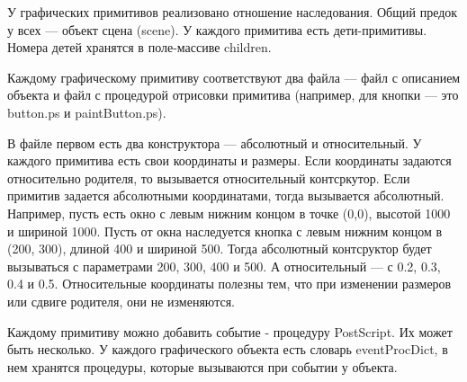 \documentclass[14pt]{extarticle}
\begin{document}
		У графических примитивов реализовано отношение наследования. Общий предок у всех --- объект сцена (scene). У каждого примитива есть дети-примитивы. Номера детей хранятся в поле-массиве children.
		
		Каждому графическому примитиву соответствуют два файла --- файл с описанием объекта и файл с процедурой отрисовки примитива (например, для кнопки --- это button.ps и paintButton.ps). 
		
		В файле первом есть два конструктора --- абсолютный и относительный. У каждого примитива есть свои координаты и размеры. Если координаты задаются относительно родителя, то вызывается относительный контсркутор. Если примитив задается абсолютными координатами, тогда вызывается абсолютный. Например, пусть есть окно с левым нижним концом в точке (0,0), высотой 1000 и шириной 1000. Пусть от окна наследуется кнопка с левым нижним концом в (200, 300), длиной 400 и шириной 500. 
		Тогда абсолютный контсруктор будет вызываться с параметрами 200, 300, 400 и 500. 
А относительный --- с 0.2, 0.3, 0.4 и 0.5.
Относительные координаты полезны тем, что при изменении размеров или сдвиге родителя, они не изменяются.

Каждому примитиву можно добавить событие - процедуру PostScript. Их может быть несколько. У каждого графического объекта есть словарь eventProcDict, в нем хранятся процедуры, которые вызываются при событии у объекта. 

	\pagebreak
\end{document}
